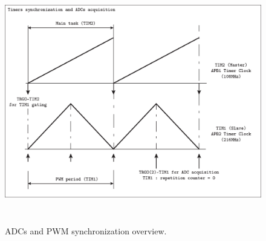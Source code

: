 \documentclass[11pt,a4paper,oneside]{book}
\numberwithin{equation}{section}
\theoremstyle{it}
\theoremstyle{definition}
\begin{document}
\begin{figure}[H]
	\centering
	\includegraphics[height= 300pt, angle = 0, 
	keepaspectratio]{figures/firmware_arch/adc_synch.eps}
	\captionsetup{width=0.5\textwidth, font=small}	
	\caption{ADCs and PWM synchronization overview.}
	\label{adc_synch}
\end{figure}
\end{document}
